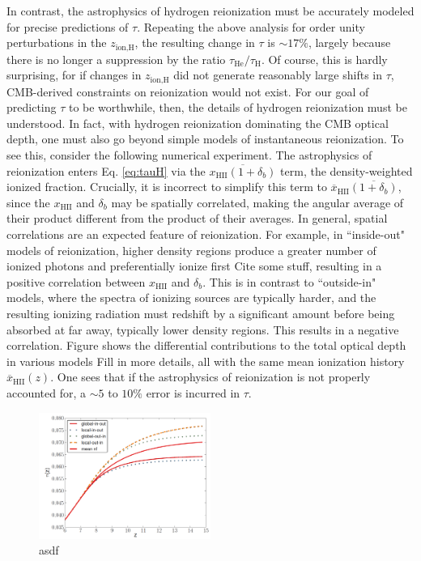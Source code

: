 \documentclass[twocolumn,aps,prd,nofootinbib,showpacs]{revtex4-1}
\begin{document}
In contrast, the astrophysics of hydrogen reionization must be accurately modeled for precise predictions of $\tau$. Repeating the above analysis for order unity perturbations in the $z_\textrm{ion,H}$, the resulting change in $\tau$ is $\sim 17\%$, largely because there is no longer a suppression by the ratio $\tau_\textrm{He} / \tau_\textrm{H}$. Of course, this is hardly surprising, for if changes in $z_\textrm{ion,H}$ did not generate reasonably large shifts in $\tau$, CMB-derived constraints on reionization would not exist. For our goal of predicting $\tau$ to be worthwhile, then, the details of hydrogen reionization must be understood. In fact, with hydrogen reionization dominating the CMB optical depth, one must also go beyond simple models of instantaneous reionization. To see this, consider the following numerical experiment. The astrophysics of reionization enters Eq. \eqref{eq:tauH} via the $\overline{x_\textrm{HII} (1+\delta_b)}$ term, the density-weighted ionized fraction. Crucially, it is incorrect to simplify this term to $\overline{x}_\textrm{HII}\overline{ (1+\delta_b)}$, since the $x_\textrm{HII}$ and $\delta_b$ may be spatially correlated, making the angular average of their product different from the product of their averages. In general, spatial correlations are an expected feature of reionization. For example, in ``inside-out" models of reionization, higher density regions produce a greater number of ionized photons and preferentially ionize first \acl{Cite some stuff}, resulting in a positive correlation between $x_\textrm{HII}$ and $\delta_b$. This is in contrast to ``outside-in" models, where the spectra of ionizing sources are typically harder, and the resulting ionizing radiation must redshift by a significant amount before being absorbed at far away, typically lower density regions. This results in a negative correlation. Figure \label{fig:InsideOutvsOutsideIn} shows the differential contributions to the total optical depth in various models \acl{Fill in more details}, all with the same mean ionization history $\overline{x}_\textrm{HII} (z) $. One sees that if the astrophysics of reionization is not properly accounted for, a $\sim 5$ to $10\%$ error is incurred in $\tau$.

\begin{figure}[!]
	\centering
	\includegraphics[width=0.5\textwidth,trim=0.5cm 0cm 0.5cm 0.80cm,clip]{figures/insideOutvsOutsideIn.pdf}
	\caption{asdf}
	\label{fig:InsideOutvsOutsideIn}
\end{figure}
\end{document}
